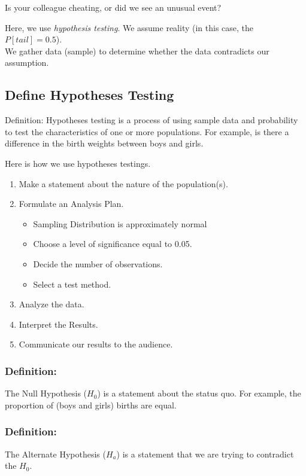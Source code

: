 \documentclass[11pt]{book}\usepackage[]{graphicx}\usepackage[]{color}
\begin{document}
Is your colleague cheating, or did we see an unusual event?

Here, we use \textit{hypothesis testing}.  We assume reality (in this case, the $P[tail] = 0.5$).  \\ We gather data (sample) to determine whether the data contradicts our assumption.

\subsection{Define Hypotheses Testing}

Definition: Hypotheses testing is a process of using sample data and probability to test the characteristics of one or more populations.  For example, is there a difference in the birth weights between boys and girls.

Here is how we use hypotheses testings.

\begin{enumerate}
\item Make a statement about the nature of the population(s).
\item Formulate an Analysis Plan.

  \begin{itemize}
  \item Sampling Distribution is approximately normal
  \item Choose a level of significance equal to 0.05.
  \item Decide the number of observations.
  \item Select a test method.
  \end{itemize}

\item Analyze the data.
\item Interpret the Results.
\item Communicate our results to the audience.
\end{enumerate}

\subsubsection{Definition:} The Null Hypothesis ($H_0$) is a statement about the status quo.  For example,  the proportion of (boys and girls) births are equal.

\subsubsection{Definition:} The Alternate Hypothesis ($H_a$) is a statement that we are trying to contradict the $H_0$.
\end{document}
